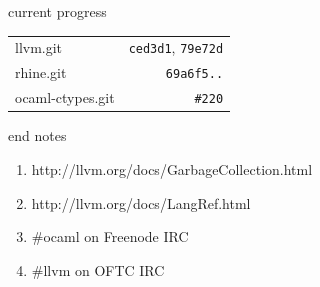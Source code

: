 \documentclass{beamer}
\begin{document}
\begin{frame}{current progress}
  \begin{tabular}{l r}
    llvm.git         & \texttt{ced3d1}, \texttt{79e72d} \\
    rhine.git        & \texttt{69a6f5..} \\
    ocaml-ctypes.git & \texttt{\#220} \\
  \end{tabular}
\end{frame}

\begin{frame}{end notes}
  \begin{enumerate}
  \item http://llvm.org/docs/GarbageCollection.html
  \item http://llvm.org/docs/LangRef.html
  \item \#ocaml on Freenode IRC
  \item \#llvm on OFTC IRC
  \end{enumerate}
\end{frame}
\end{document}
